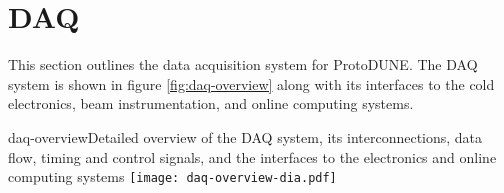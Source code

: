 \section{DAQ} \label{sec:daq}

This section outlines the data acquisition system for ProtoDUNE.
The DAQ system is shown in figure \ref{fig:daq-overview} along with its
interfaces to the cold electronics, beam instrumentation, and online
computing systems.


\begin{cdrfigure}{daq-overview}{Detailed overview of the
DAQ system, its interconnections, data flow, timing and control signals,
and the interfaces to the electronics and online computing systems
}
        \texttt{[image: daq-overview-dia.pdf]}
\end{cdrfigure}








